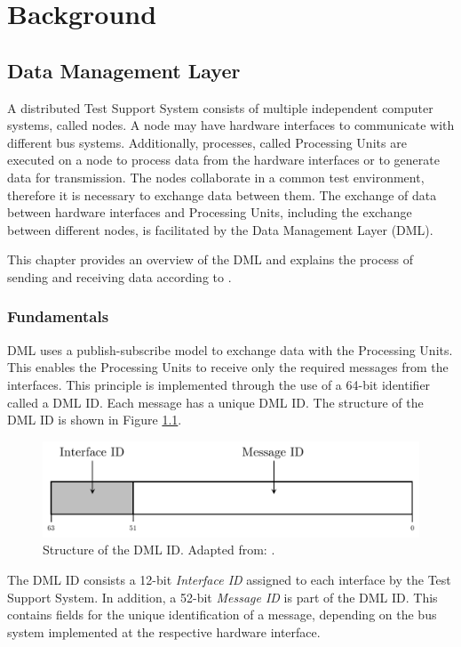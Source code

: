 \chapter{Background}

\section{Data Management Layer}
A distributed Test Support System consists of multiple independent computer systems, called nodes. A node may have hardware interfaces to communicate with different bus systems. Additionally, processes, called Processing Units are executed on a node to process data from the hardware interfaces or to generate data for transmission. The nodes collaborate in a common test environment, therefore it is necessary to exchange data between them. The exchange of data between hardware interfaces and Processing Units, including the exchange between different nodes, is facilitated by the Data Management Layer (DML).

This chapter provides an overview of the DML and explains the process of sending and receiving data according to \cite{dml01}.

\subsection{Fundamentals}
DML uses a publish-subscribe model to exchange data with the Processing Units. This enables the Processing Units to receive only the required messages from the interfaces. This principle is implemented through the use of a 64-bit identifier called a DML ID. Each message has a unique DML ID.  The structure of the DML ID is shown in Figure \ref{fig:DmlId}.

\begin{figure}[h!]
    \centering
    \includegraphics[width=0.8\linewidth]{figures/dml/dml01.pdf}
    \caption[Structure of the DML ID]{Structure of the DML ID. Adapted from: \cite{dml01}.}
    \label{fig:DmlId}
\end{figure}

The DML ID consists a 12-bit \textit{Interface ID} assigned to each interface by the Test Support System. In addition, a 52-bit \textit{Message ID} is part of the DML ID. This contains fields for the unique identification of a message, depending on the bus system implemented at the respective hardware interface.

